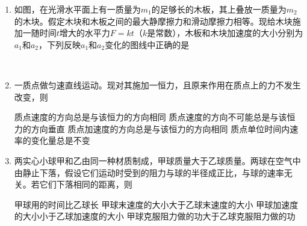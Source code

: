 \begin{enumerate}[leftmargin=0em]
\begin{enumerate}
\end{enumerate}
\begin{figure}[h!]
\flushright

\end{figure}



\item 
{}	
如图，在光滑水平面上有一质量为$ m_{1} $的足够长的木板，其上叠放一质量为$ m_{2} $的木块。假定木块和木板之间的最大静摩擦力和滑动摩擦力相等。现给木块施加一随时间$ t $增大的水平力$ F=kt $（$ k $是常数），木板和木块加速度的大小分别为$ a_{1} $和$ a_{2} $，下列反映$ a_{1} $和$ a_{2} $变化的图线中正确的是  
\begin{figure}[h!]
\centering
\\

\end{figure}





\item 
{}
一质点做匀速直线运动。现对其施加一恒力，且原来作用在质点上的力不发生改变，则  


\fourchoices
{质点速度的方向总是与该恒力的方向相同}
{质点速度的方向不可能总是与该恒力的方向垂直}
{质点加速度的方向总是与该恒力的方向相同}
{质点单位时间内速率的变化量总是不变}


\item 
{}
两实心小球甲和乙由同一种材质制成，甲球质量大于乙球质量。两球在空气中由静止下落，假设它们运动时受到的阻力与球的半径成正比，与球的速率无关。若它们下落相同的距离，则  


\fourchoices
{甲球用的时间比乙球长}
{甲球末速度的大小大于乙球末速度的大小}
{甲球加速度的大小小于乙球加速度的大小}
{甲球克服阻力做的功大于乙球克服阻力做的功}





\end{enumerate}
